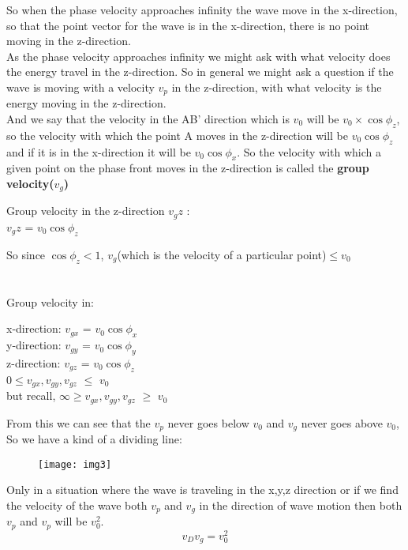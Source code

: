 So when the phase velocity approaches infinity the wave move in the x-direction, so that the point vector for the wave is in the x-direction, there is no point moving in the z-direction.\\
As the phase velocity approaches infinity we might ask with what velocity does the energy travel in the z-direction.
So in general we might ask a question if the wave is moving with a velocity $v_p$ in the z-direction, with what velocity is the energy moving in the z-direction.\\
And we say that the velocity in the AB' direction which is $v_0$ will be $v_0\times\cos\phi_{z}$, so the velocity with which the point A moves in the z-direction will be $v_0\cos\phi_{z}$ and if it is in the x-direction it will be $v_0\cos\phi_{x}$. So the velocity with which a given point on the phase front moves in the z-direction is called the \textbf{group velocity($v_g$)}

\begin{center}
	Group velocity in the z-direction $v_gz$ :\\
$v_gz$ = $v_0\cos\phi_{z}$
\end{center}
So since $\cos\phi_{z} < 1$, $v_g$(which is the velocity of a particular point)$\leq v_0$\\
\\
\\
Group velocity in:
\begin{center}
	x-direction:	$v_{gx}$ = $v_0\cos\phi_{x}$\\
	y-direction: 	$v_{gy}$ = $v_0\cos\phi_{y}$\\
	z-direction:	$v_{gz}$ = $v_0\cos\phi_{z}$\\
	$0\leq v_{gx},v_{gy},v_{gz}$ $\leq$ $v_0$\\
	but recall,		$\infty\geq v_{gx},v_{gy},v_{gz}$ $\geq$ $v_0$
\end{center}

From this we can see that the $v_p$ never goes below $v_0$ and $v_g$ never goes above $v_0$,\\
So we have a kind of a dividing line:\\

\begin{figure}
	\centering
	\texttt{[image: img3]}
	\caption{}
\end{figure}

Only in a situation where the wave is traveling in the x,y,z direction or if we find the velocity of the wave both $v_p$ and $v_g$ in the direction of wave motion then both $v_p$ and $v_p$ will be $v_{0}^2$.
\begin{equation}
	v_D v_g = v_{0}^2
\end{equation}

